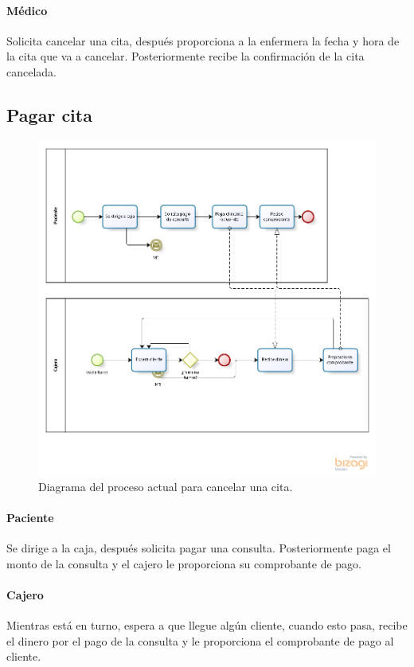 \paragraph{Médico}
Solicita cancelar una cita, después proporciona a la enfermera la fecha y hora de la cita que va a cancelar. Posteriormente recibe la confirmación de la cita cancelada.

\subsection{Pagar cita}
\begin{figure}[htbp!]
	\centering
	\includegraphics[width=\textwidth]{images/procesos/pago_consulta_old}
	\caption{Diagrama del proceso actual para cancelar una cita.}
\end{figure}
\paragraph{Paciente}
Se dirige a la caja, después solicita pagar una consulta. Posteriormente paga el monto de la consulta y el cajero le proporciona su comprobante de pago.
\paragraph{Cajero}
Mientras está en turno, espera a que llegue algún cliente, cuando esto pasa, recibe el dinero por el pago de la consulta y le proporciona el comprobante de pago al cliente.
